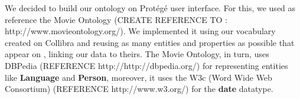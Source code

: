 We decided to build our ontology on Protégé user interface. For this, we used as reference the Movie Ontology \cite{movieontology} (CREATE REFERENCE TO : http://www.movieontology.org/). We implemented it using our vocabulary created on Collibra and reusing as many entities and properties as possible that appear on \cite{movieontology}, linking our data to theirs. The Movie Ontology, in turn, uses DBPedia \cite{dbpedia} (REFERENCE http://http://dbpedia.org/) for representing entities like \textbf{Language} and \textbf{Person}, moreover, it uses the W3c (Word Wide Web Consortium) \cite{w3c} (REFERENCE http://www.w3.org/) for the \textbf{date} datatype.
